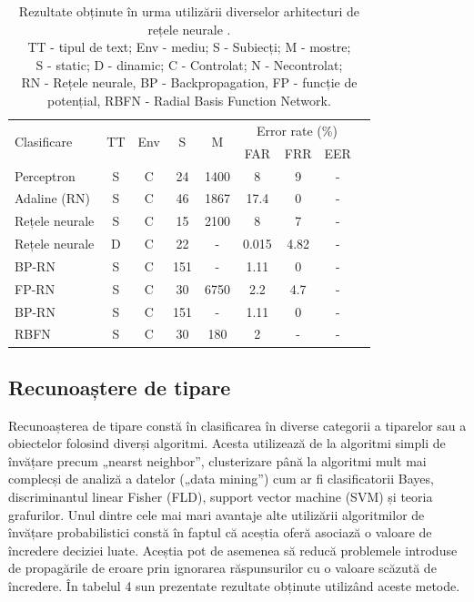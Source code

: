 \documentclass[9pt,shortpaper,twoside,web]{ieeecolor}
\begin{document}
\begin{table}[H]
	\begin{tabular}[c]{lcccccccc}
	\hline
	\multirow{2}{*}{Clasificare} & \multirow{2}{*}{TT} & \multirow{2}{*}{Env} & \multirow{2}{*}{S} & \multirow{2}{*}{M} & \multicolumn{3}{c}{Error rate (\%)} \\
	\cline{6-8}
            &    &     &   &   &  FAR & FRR & EER \\
	\hline
	Perceptron	     				& S & C &  24 & 1400 &  8      &  9    & - \\
	Adaline (RN)	  				& S & C &  46 & 1867 & 17.4    &  0    & - \\
	Rețele neurale	  				& S & C &  15 & 2100 &  8      &  7    & - \\
	Rețele neurale	  				& D & C &  22 &    - &  0.015  &  4.82 & - \\
	BP-RN			  				& S & C & 151 &    - &  1.11   &  0    & - \\
	FP-RN							& S & C &  30 & 6750 &  2.2    &  4.7  & - \\
	BP-RN			  				& S & C & 151 &    - &  1.11   &  0    & - \\
	RBFN			  				& S & C &  30 &  180 &  2      &  -    & - \\
	
	\hline
	\end{tabular}
	
\caption{
Rezultate obținute în urma utilizării diverselor arhitecturi de rețele neurale \cite{b3}.\\
TT - tipul de text; Env - mediu; S - Subiecți; M - mostre;\\
S - static; D - dinamic; C - Controlat; N - Necontrolat;\\
RN - Rețele neurale, BP - Backpropagation, FP - funcție de potențial, RBFN - Radial Basis Function Network.
}
\end{table}


\subsection{Recunoaștere de tipare}
	Recunoașterea de tipare constă în clasificarea în diverse categorii a tiparelor sau a obiectelor folosind diverși algoritmi. Acesta utilizează de la algoritmi simpli de învățare precum „nearst neighbor”, clusterizare până la algoritmi mult mai complecși de analiză a datelor („data mining”) cum ar fi clasificatorii Bayes, discriminantul linear Fisher (FLD), support vector machine (SVM) și teoria grafurilor. Unul dintre cele mai mari avantaje alte utilizării algoritmilor de învățare probabilistici constă în faptul că aceștia oferă asociază o valoare de încredere deciziei luate. Aceștia pot de asemenea să reducă problemele introduse de propagările de eroare prin ignorarea răspunsurilor cu o valoare scăzută de încredere. În tabelul 4 sun prezentate rezultate obținute utilizând aceste metode. 
	
\end{document}
